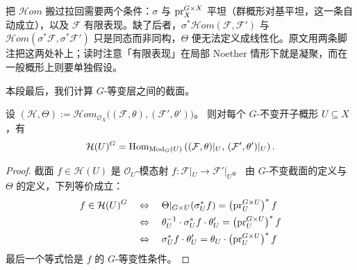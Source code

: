 \begin{yizhu}
把 $\mathcal{H}om$ 搬过拉回需要两个条件：$\sigma$ 与 $\operatorname{\operatorname{pr}}_X^{G\times X}$ 平坦（群概形对基平坦，这一条自动成立），以及 $\mathcal{F}$ 有限表现。缺了后者，$\sigma^*\mathcal{H}om(\mathcal{F},\mathcal{F}')$ 与 $\mathcal{H}om(\sigma^*\mathcal{F},\sigma^*\mathcal{F}')$ 只是同态而非同构，$\Theta$ 便无法定义成线性化。原文用两条脚注把这两处补上；读时注意「有限表现」在局部 Noether 情形下就是凝聚，而在一般概形上则要单独假设。
\end{yizhu}

本段最后，我们计算 $G$-等变层之间的截面。
\begin{prop}\label{prop:InvariantSectionsOfEquivariantInternalHom}
设
$(\mathcal H,\Theta)
:=
\mathcal Hom_{\mathcal O_X}
\bigl((\mathcal F,\theta),(\mathcal F',\theta')\bigr)$。
则对每个 $G$-不变开子概形 $U\subseteq X$，有
$$
\mathcal H(U)^G
=
\operatorname{\operatorname{Hom}}_{\operatorname{\mathrm{Mod}}_G(U)}
\left(
(\mathcal F,\theta)|_U,\,
(\mathcal F',\theta')|_U
\right).
$$
\end{prop}

\begin{proof}
截面 $f\in\mathcal H(U)$ 是 $\mathcal O_U$-模态射 $f:\mathcal F|_U\rightarrow\mathcal F'|_U$。
由 $G$-不变截面的定义与 $\Theta$ 的定义，下列等价成立：
\begin{align*}
f\in\mathcal H(U)^G
&\quad\Leftrightarrow\quad
\Theta|_{G\times U}(\sigma_U^*f)
=
\left(\operatorname{\operatorname{pr}}_U^{G\times U}\right)^*f
\\
&\quad\Leftrightarrow\quad
\theta_U^{-1}\cdot\sigma_U^*f\cdot\theta'_U
=
\left(\operatorname{\operatorname{pr}}_U^{G\times U}\right)^*f
\\
&\quad\Leftrightarrow\quad
\sigma_U^*f\cdot\theta'_U
=
\theta_U\cdot
\left(\operatorname{\operatorname{pr}}_U^{G\times U}\right)^*f
\end{align*}
最后一个等式恰是 $f$ 的 $G$-等变性条件。
\end{proof}
